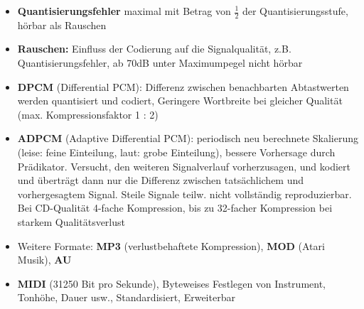 \documentclass[12pt,landscape]{article}
\begin{document}
\begin{multicols}{3}
\begin{itemize}
\item \textbf{Quantisierungsfehler} maximal mit Betrag von $\frac{1}{2}$ der Quantisierungsstufe, hörbar als Rauschen
\item \textbf{Rauschen:} Einfluss der Codierung auf die Signalqualität, z.B. Quantisierungsfehler, ab 70dB unter Maximumpegel nicht hörbar
\item \textbf{DPCM} (Differential PCM): Differenz zwischen benachbarten Abtastwerten werden quantisiert und codiert, Geringere Wortbreite bei gleicher Qualität (max. Kompressionsfaktor 1 : 2)
\item \textbf{ADPCM} (Adaptive Differential PCM): periodisch neu berechnete Skalierung (leise: feine Einteilung, laut: grobe Einteilung), bessere Vorhersage durch Prädikator. Versucht, den weiteren Signalverlauf vorherzusagen, und kodiert und überträgt dann nur die Differenz zwischen tatsächlichem und vorhergesagtem Signal. Steile Signale teilw. nicht vollständig reproduzierbar. Bei CD-Qualität 4-fache Kompression, bis zu 32-facher Kompression bei starkem Qualitätsverlust
\item Weitere Formate: \textbf{MP3} (verlustbehaftete Kompression), \textbf{MOD} (Atari Musik), \textbf{AU}
\item \textbf{MIDI} (31250 Bit pro Sekunde), Byteweises Festlegen von Instrument, Tonhöhe, Dauer usw., Standardisiert, Erweiterbar
\end{itemize}

\end{multicols}
\end{document}
